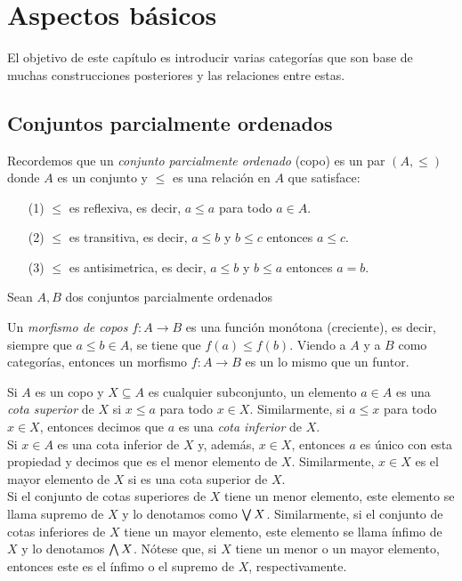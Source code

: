 \chapter{Aspectos básicos}\label{chap 1}

El objetivo de este capítulo es introducir varias categorías que son base de muchas construcciones posteriores y las
relaciones entre estas.

\section{Conjuntos parcialmente ordenados}\label{copos}



Recordemos que un \emph{ conjunto parcialmente ordenado } (copo) es un par $(A,\leq)$ donde $A$ es un conjunto y $\leq$ es una relación en $A$ que satisface:
\begin{itemize}
  \item[(1)] $\leq$ es reflexiva, es decir, $a\leq a$ para todo $a\in A$.
  \item[(2)]  $\leq$ es transitiva, es decir, $a\leq b$ y $b\leq c$ entonces $a\leq c$.
  \item[(3)] $\leq$ es antisimetrica, es decir, $a\leq b$ y $b\leq a$ entonces $a=b$.
\end{itemize}




Sean $A,B$ dos conjuntos parcialmente ordenados

Un \emph{morfismo de copos } $f:A\to B$ es una función monótona (creciente), es decir,
siempre que $a\leq b\in A$, se tiene que $f(a)\leq f(b)$.
Viendo a $A$ y a $B$ como categorías, entonces un morfismo $f:A\to B$
es un lo mismo que un funtor.

Si $A$ es un copo y $X\subseteq A$ es cualquier subconjunto,
un elemento $a\in A$ es una \emph{ cota superior } de $X$
si $x\leq a$ para todo $x\in X$.
Similarmente, si $a\leq x$ para todo $x\in X$, entonces decimos
que $a$ es una \emph{ cota inferior } de $X$. \\
Si $x\in A$ es una cota inferior de $X$ y, además, $x\in X$,
entonces $a$ es único con esta propiedad y decimos que es el
menor elemento de $X$. Similarmente, $x\in X$ es el mayor
elemento de $X$ si es una cota superior de $X$. \\
Si el conjunto de cotas superiores de $X$ tiene un menor
elemento, este elemento se llama supremo de $X$ y lo denotamos
como $\bigvee X$.
Similarmente, si el conjunto de cotas inferiores de $X$ tiene un
mayor elemento, este elemento se llama ínfimo de $X$ y lo
denotamos $\bigwedge X$.
Nótese que, si $X$ tiene un menor o un mayor elemento, entonces este
es el ínfimo o el supremo de $X$, respectivamente.


